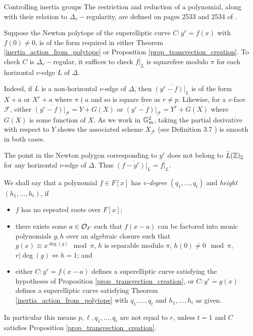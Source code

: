 \documentclass[11pt,a4paper]{article}
\newcommand{\Dv}{\Delta_v}
\newcommand{\D}{\Delta}
\newcommand{\F}{\mathcal{F}}
\begin{document}
\begin{section}{Controlling inertia groups}
The restriction and reduction of a polynomial, along with their relation to $\Dv-$regularity, are defined on pages 2533 and 2534 of \cite{Models_Curves_DVR}.

\begin{remark}
Suppose the Newton polytope of the superelliptic curve $C \colon y^r=f(x)$ with $f(0)\neq 0$, is of the form required in either Theorem \ref{inertia_action_from_polytope} or Proposition \ref{prop_transvection_creation}. To check $C$ is $\Dv-$regular, it suffices to check $\overline{f|_L}$ is squarefree modulo $\pi$ for each horizontal $v$-edge $L$ of $\Delta$.

Indeed, if $L$ is a non-horizontal $v$-edge of $\D$, then $\overline{(y^r-f)|_L}$ is of the form $ X + a$ or $X^r+a$ where $\pi \nmid a$ and so is square free as $r \neq p$.
Likewise, for a $v$-face $\F$, either $\overline{(y^r-f)|_\F} = Y + G(X)$ or $\overline{(y^r-f)|_\F} = Y^r + G(X)$ where $G(X)$ is some function of $X$. As we work in $\mathbb{G}_m^2$, taking the partial derivative with respect to $Y$ shows the associated scheme $X_\F$ (see Definition 3.7 \cite{Models_Curves_DVR}) is smooth in both cases.

The point in the Newton polygon corresponding to $y^r$ does not belong to ${\bar L(\mathbb{Z})_{\mathbb{Z}}}$ for any horizontal $v$-edge of $\D$. Thus $\overline{(f-y^r)|_L} = \overline{f|_L}$.
\end{remark}


\begin{definition}
We shall say that a polynomial $f\in F[x]$ has \emph{$v$-degree} $(q_1, \ldots, q_t)$ and \emph{height} $(h_1, \ldots, h_t)$, if
\begin{itemize}
    \item $f$ has no repeated roots over $F[x]$;
    \item there exists some $a \in \mathcal{O}_F$ such that $f(x-a)$ can be factored into monic polynomials $g,h$ over an algebraic closure such that $g(x) \equiv x^{\deg(g)} \mod{\pi}$, $h$ is separable modulo $\pi$, $h(0) \neq 0 \mod{\pi}$, $r|\deg(g) \iff h=1$; and
    \item either $C\colon y^r=f(x-a)$ defines a superelliptic curve satisfying the hypotheses of Proposition \ref{prop_transvection_creation}, or $C\colon y^r=g(x)$ defines a superelliptic curve satisfying Theorem \ref{inertia_action_from_polytope} with $q_1,\ldots, q_t$ and $h_1,\ldots,h_t$ as given.
\end{itemize}
In particular this means $p,\ell,q_1, \ldots ,q_t$ are not equal to $r$, unless $t=1$ and $C$ satisfies Proposition \ref{prop_transvection_creation}.


\end{definition}
\end{section}
\end{document}

